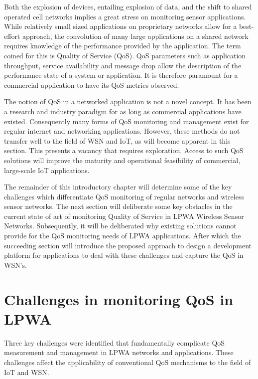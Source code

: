 Both the explosion of devices, entailing explosion of data, and the shift to shared operated cell networks implies a great stress on monitoring sensor applications. While relatively small sized applications on proprietary networks allow for a best-effort approach, the convolution of many large applications on a shared network requires knowledge of the performance provided by the application. The term coined for this is Quality of Service (QoS). QoS parameters such as application throughput, service availability and message drop allow the description of the performance state of a system or application. It is therefore paramount for a commercial application to have its QoS metrics observed. 

The notion of QoS in a networked application is not a novel concept. It has been a research and industry paradigm for as long as commercial applications have existed. Consequently many forms of QoS monitoring and management exist for regular internet and networking applications. However, these methods do not transfer well to the field of WSN and IoT, as will become apparent in this section. This presents a vacancy that requires exploration. Access to such QoS solutions will improve the maturity and operational feasibility of commercial, large-scale IoT applications.

The remainder of this introductory chapter will determine some of the key challenges which differentiate QoS monitoring of regular networks and wireless sensor networks. The next section will deliberate some key obstacles in the current state of art of monitoring Quality of Service in LPWA Wireless Sensor Networks. Subsequently, it will be deliberated why existing solutions cannot provide for the QoS monitoring  needs of LPWA applications. After which the succeeding section will introduce the proposed approach to design a development platform for applications to deal with these challenges and capture the QoS in WSN's.


\section{Challenges in monitoring QoS in LPWA}
\label{sec:challenges}
Three key challenges were identified that fundamentally complicate QoS measurement and management in LPWA networks and applications. These challenges affect the applicability of conventional QoS mechanisms to the field of IoT and WSN. %

